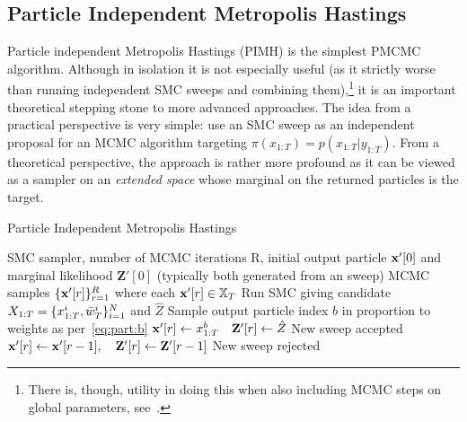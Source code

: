 \subsection{Particle Independent Metropolis Hastings}
\label{sec:part:pmcmc:pimh}

Particle independent Metropolis Hastings (PIMH) is the simplest PMCMC algorithm.  Although in isolation it is
not especially useful (as it strictly worse than running independent SMC sweeps and combining 
them),\footnote{There is, though, utility in doing this when also including MCMC steps on global parameters, see~\cite{andrieu2010particle}.}
 it is an
important theoretical stepping stone to more advanced approaches.  The idea from a practical perspective 
is very simple: use an SMC sweep as an independent proposal for an MCMC algorithm targeting $\pi(x_{1:T}) = p(x_{1:T}|y_{1:T})$.
From a theoretical perspective, the approach is rather more profound as it can be viewed as a sampler on 
an \emph{extended space} whose marginal on the returned particles is the target.  

\begin{algorithm}[tb]
	\caption{Particle Independent Metropolis Hastings}
	\label{alg:part:pimh}
	\begin{spacing}{1.2}
		\begin{algorithmic}[1]
			\renewcommand{\algorithmicrequire}{\textbf{Inputs:}}
			\renewcommand{\algorithmicensure}{\textbf{Outputs:}}				 
			\Require SMC sampler, number of MCMC iterations R, initial output particle $\mathbf{x}'[0]$ and marginal likelihood
			$\mathbf{Z}'[0]$ (typically both generated from an \smc sweep)
			\Ensure MCMC samples $\{\mathbf{x}'[r]\}_{r=1}^R$ where each $\mathbf{x}'[r] \in \mathbb{X}_T$
			\State Run SMC giving candidate $X_{1:T} = \{x_{1:T}^{i},\bar w_T^{i}\}_{i=1}^N$
				 and $\hat{Z}$
			\State Sample output particle index $b$ in proportion to weights as per~\eqref{eq:part:b}
			\State $\mathbf{x}'[r] \leftarrow x_{1:T}^b \quad \mathbf{Z}'[r] \leftarrow \hat{Z}$  \Comment New sweep accepted
			\Else
			\State $\mathbf{x}'[r]\leftarrow \mathbf{x}'[r-1], \quad \mathbf{Z}'[r] \leftarrow \mathbf{Z}'[r-1]$ \Comment New sweep rejected
			\EndIf
			\EndFor
		\end{algorithmic}
	\end{spacing}
\end{algorithm}

